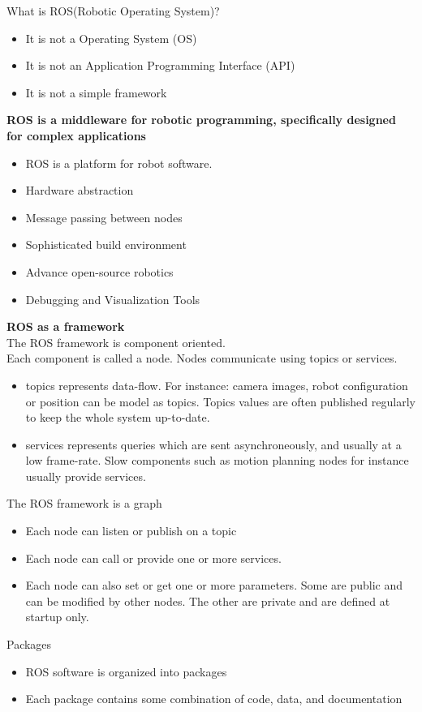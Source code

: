 \documentclass{beamer}
\begin{document}
	\begin{frame}
		What is ROS(Robotic Operating System)?
		\begin{itemize}
			\item It is not a Operating System (OS)
			\item It is not an Application Programming Interface (API)
			\item It is not a simple framework
		\end{itemize}
		\textbf{ROS is a middleware for robotic programming, specifically designed for complex applications}
		\begin{itemize}
			\item ROS is a platform for robot software.
			\item Hardware abstraction
			\item Message passing between nodes
			\item Sophisticated build environment
			\item Advance open-source robotics
			\item Debugging and Visualization Tools
		\end{itemize}
	\end{frame}
	\begin{frame}
	\textbf{ROS as a framework } \\
		The ROS framework is component oriented. \\
		Each component is called a node. Nodes communicate using topics or services.
		\begin{itemize}
			\item topics represents data-flow. For instance: camera images, robot configuration or position can be model as topics. Topics values are often published regularly to keep the whole system up-to-date.
			\item services represents queries which are sent asynchroneously, and usually at a low frame-rate. Slow components such as motion planning nodes for instance usually provide services.
		\end{itemize}
	\end{frame}
	\begin{frame}
	The ROS framework is a graph
		\begin{itemize}
			\item Each node can listen or publish on a topic
			\item Each node can call or provide one or more services.
			\item Each node can also set or get one or more parameters. Some are public	and can be modified by other nodes. The other are private and are defined at startup only.
		\end{itemize}
		Packages
		\begin{itemize}
			\item ROS software is organized into packages
			\item Each package contains some combination of	code, data, and documentation
		\end{itemize}
	\end{frame}
\end{document}
